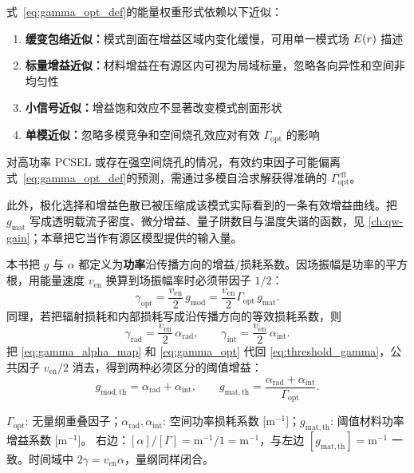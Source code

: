 \begin{WarningBox}[能量权重近似的适用条件]
式~\eqref{eq:gamma_opt_def}的能量权重形式依赖以下近似：
\begin{enumerate}
  \item \textbf{缓变包络近似：}模式剖面在增益区域内变化缓慢，可用单一模式场 $E(r)$ 描述
  \item \textbf{标量增益近似：}材料增益在有源区内可视为局域标量，忽略各向异性和空间非均匀性
  \item \textbf{小信号近似：}增益饱和效应不显著改变模式剖面形状
  \item \textbf{单模近似：}忽略多模竞争和空间烧孔效应对有效 $\Gamma_{\mathrm{opt}}$ 的影响
\end{enumerate}
对高功率 PCSEL 或存在强空间烧孔的情况，有效约束因子可能偏离式~\eqref{eq:gamma_opt_def}的预测，需通过多模自洽求解获得准确的 $\Gamma_{\mathrm{opt}}^{\mathrm{eff}}$。
\end{WarningBox}
此外，极化选择和增益色散已被压缩成该模式实际看到的一条有效增益曲线。把 $g_{\mathrm{mat}}$ 写成透明载流子密度、微分增益、量子阱数目与温度失谐的函数，见 \cref{ch:qw-gain}；本章把它当作有源区模型提供的输入量。

本书把 $g$ 与 $\alpha$ 都定义为\textbf{功率}沿传播方向的增益/损耗系数。因场振幅是功率的平方根，用能量速度 $v_{\mathrm{en}}$ 换算到场振幅率时必须带因子 $1/2$：
\begin{equation}
\gamma_{\mathrm{opt}} = \frac{v_{\mathrm{en}}}{2}\, g_{\mathrm{mod}} = \frac{v_{\mathrm{en}}}{2}\Gamma_{\mathrm{opt}}\, g_{\mathrm{mat}}.
\label{eq:gamma_opt}
\end{equation}
同理，若把辐射损耗和内部损耗写成沿传播方向的等效损耗系数，则
\begin{equation}
\gamma_{\mathrm{rad}}=\frac{v_{\mathrm{en}}}{2}\,\alpha_{\mathrm{rad}},
\qquad
\gamma_{\mathrm{int}}=\frac{v_{\mathrm{en}}}{2}\,\alpha_{\mathrm{int}}.
\label{eq:gamma_alpha_map}
\end{equation}
把 \cref{eq:gamma_alpha_map} 和 \cref{eq:gamma_opt} 代回 \cref{eq:threshold_gamma}，公共因子 $v_{\mathrm{en}}/2$ 消去，得到两种必须区分的阈值增益：
\begin{equation}
g_{\mathrm{mod,th}}=\alpha_{\mathrm{rad}}+\alpha_{\mathrm{int}},
\qquad
g_{\mathrm{mat,th}} = \frac{\alpha_{\mathrm{rad}}+\alpha_{\mathrm{int}}}{\Gamma_{\mathrm{opt}}}.
\label{eq:threshold_g_th_final}
\end{equation}

\begin{DimensionCheckNote}[阈值增益公式的量纲自洽性]
$\Gamma_{\mathrm{opt}}$: 无量纲重叠因子；$\alpha_{\mathrm{rad}},\alpha_{\mathrm{int}}$: 空间功率损耗系数 [$\mathrm{m}^{-1}$]；$g_{\mathrm{mat,th}}$: 阈值材料功率增益系数 [$\mathrm{m}^{-1}$]。
右边：$[\alpha]/[\Gamma] = \mathrm{m}^{-1}/1 = \mathrm{m}^{-1}$，与左边 $[g_{\mathrm{mat,th}}]=\mathrm{m}^{-1}$ 一致。时间域中 $2\gamma=v_{\mathrm{en}}\alpha$，量纲同样闭合。
\end{DimensionCheckNote}

